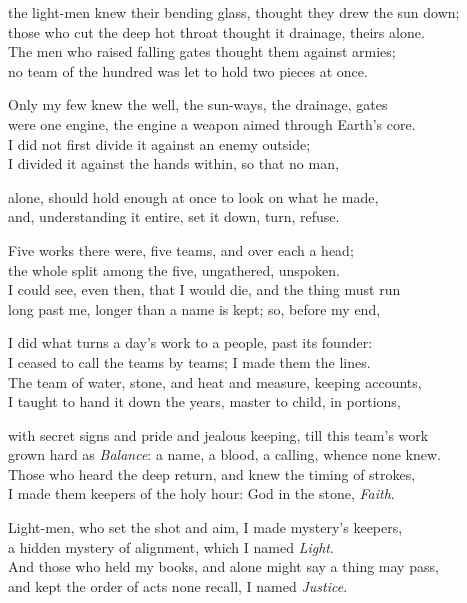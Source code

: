 \begin{founder}
the light-men knew their bending glass, thought they drew the sun down;\\
those who cut the deep hot throat thought it drainage, theirs alone.\\
The men who raised falling gates thought them against armies;\\
no team of the hundred was let to hold two pieces at once.\\
\medskip

Only my few knew the well, the sun-ways, the drainage, gates\\
were one engine, the engine a weapon aimed through Earth's core.\\
I did not first divide it against an enemy outside;\\
I divided it against the hands within, so that no man,\\
\medskip

alone, should hold enough at once to look on what he made,\\
and, understanding it entire, set it down, turn, refuse.

Five works there were, five teams, and over each a head;\\
the whole split among the five, ungathered, unspoken.\\
I could see, even then, that I would die, and the thing must run\\
long past me, longer than a name is kept; so, before my end,\\
\medskip

I did what turns a day's work to a people, past its founder:\\
I ceased to call the teams by teams; I made them the lines.\\
The team of water, stone, and heat and measure, keeping accounts,\\
I taught to hand it down the years, master to child, in portions,\\
\medskip

with secret signs and pride and jealous keeping, till this team's work\\
grown hard as \emph{Balance}: a name, a blood, a calling, whence none knew.\\
Those who heard the deep return, and knew the timing of strokes,\\
I made them keepers of the holy hour: God in the stone, \emph{Faith}.\\
\medskip

Light-men, who set the shot and aim, I made mystery's keepers,\\
a hidden mystery of alignment, which I named \emph{Light}.\\
And those who held my books, and alone might say a thing may pass,\\
and kept the order of acts none recall, I named \emph{Justice}.\\
\medskip


\end{founder}

